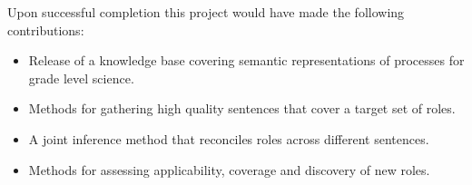 Upon successful completion this project would have made the following contributions:
\begin{itemize}
\item Release of a knowledge base covering semantic representations of processes for grade level science.
\item Methods for gathering high quality sentences that cover a target set of roles. 
\item A joint inference method that reconciles roles across different sentences.  
\item Methods for assessing applicability, coverage and discovery of new roles.
\end{itemize}



